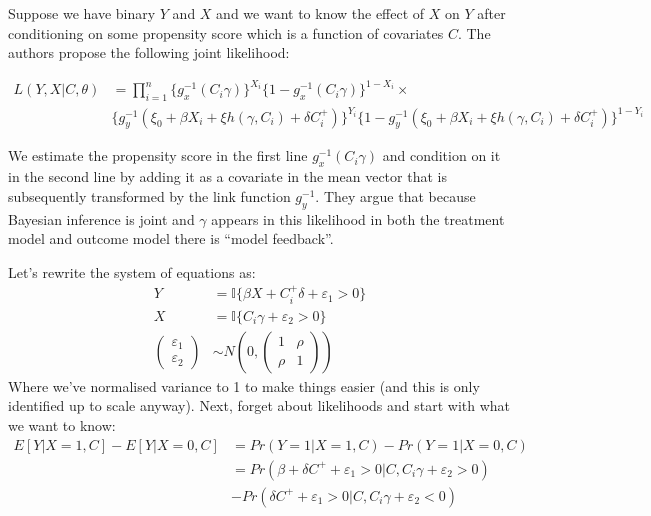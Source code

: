 \documentclass{article}
\begin{document}
   
Suppose we have binary $Y$ and $X$ and we want to know the effect of $X$ on $Y$ 
after conditioning on some propensity score which is a function of covariates 
$C$. The authors propose the following joint likelihood:

\begin{align*}
    L(Y, X | C, \theta) &= \prod^n_{i = 1} \{
        g_x^{-1}(C_i \gamma)\}^{X_i} \{
            1 - g_x^{-1}(C_i\gamma)\}^{1 - X_i} \times \\
            &\{
                g_y^{-1}(\xi_0 + \beta X_i + \xi h(\gamma, C_i) + \delta C^+_i)
                \}^{Y_i} 
                \{1 -
                g_y^{-1}(\xi_0 + \beta X_i + \xi h(\gamma, C_i) + \delta C^+_i)
                \}^{1 - Y_i} 
\end{align*}

We estimate the propensity score in the first line $g_x^{-1}(C_i\gamma)$ and 
condition on it in the second line by adding it as a covariate in the mean vector 
that is subsequently transformed by the link function $g_y^{-1}$.
They argue that because Bayesian inference is joint and $\gamma$ appears in this likelihood in both the treatment 
model and outcome model there is ``model feedback''.


Let's rewrite the system of equations as:
\begin{align*}
    Y &= \mathbb{I}\{\beta X +  C_i^+ \delta + \varepsilon_1 > 0\} \\
    X &= \mathbb{I}\{ C_i\gamma + \varepsilon_2 > 0 \} \\
    \begin{pmatrix}
        \varepsilon_1 \\
        \varepsilon_2
    \end{pmatrix} &\sim N\left(0, \begin{pmatrix}
        1 & \rho \\
        \rho & 1
    \end{pmatrix}\right)
\end{align*}
Where we've normalised variance to 1 to make things easier (and this is only 
identified up to scale anyway). Next, forget about likelihoods and start with what we want to know:
\begin{align*}
    E[Y | X = 1, C] - E[Y | X = 0, C] &= Pr(Y = 1 | X = 1, C) - Pr(Y = 1 | X = 0, C) \\
    &= Pr( \beta  + \delta C^+ + \varepsilon_1 > 0 | C, C_i\gamma + \varepsilon_2 > 0) \\
    &- Pr(\delta C^+ + \varepsilon_1 > 0 | C, C_i \gamma + \varepsilon_2 < 0)
\end{align*}
\end{document}

